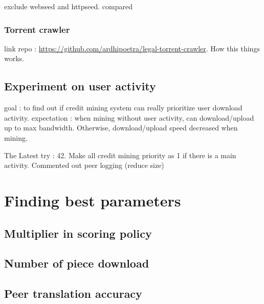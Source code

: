 exclude webseed and httpseed.
compared 

\subsubsection{Torrent crawler}
link repo : \url{https://github.com/ardhipoetra/legal-torrent-crawler}. How this things works.

\subsection{Experiment on user activity}
goal : to find out if credit mining system can really prioritize user download activity. expectation : when mining without user activity, can download/upload up to max bandwidth. Otherwise, download/upload speed decreased when mining.

The Latest try : 42. 
Make all credit mining priority as 1 if there is a main activity. Commented out peer logging (reduce size)

\section{Finding best parameters}
\label{section:cmparamexp}

\subsection{Multiplier in scoring policy}
\subsection{Number of piece download}
\subsection{Peer translation accuracy}


